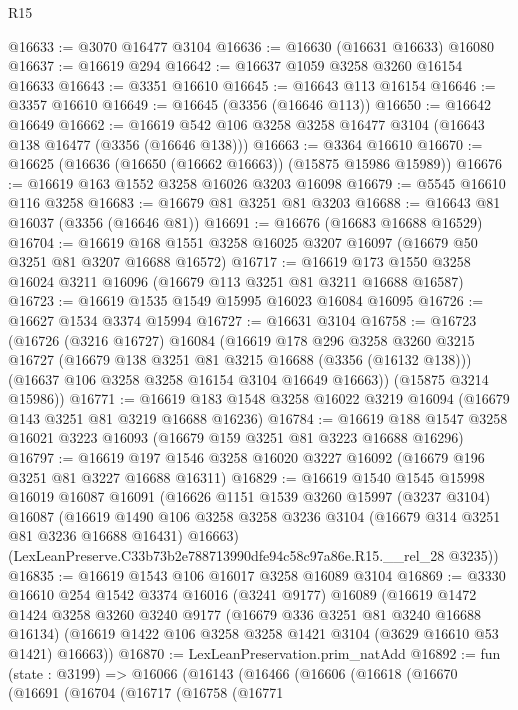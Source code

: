 \begin{lexlean}{R15}
\begin{coremodule}
@16633 := @3070 @16477 @3104
@16636 := @16630 (@16631 @16633) @16080
@16637 := @16619 @294
@16642 := @16637 @1059 @3258 @3260 @16154 @16633
@16643 := @3351 @16610
@16645 := @16643 @113 @16154
@16646 := @3357 @16610
@16649 := @16645 (@3356 (@16646 @113))
@16650 := @16642 @16649
@16662 := @16619 @542 @106 @3258 @3258 @16477 @3104 (@16643 @138 @16477 (@3356 (@16646 @138)))
@16663 := @3364 @16610
@16670 := @16625 (@16636 (@16650 (@16662 @16663)) (@15875 @15986 @15989))
@16676 := @16619 @163 @1552 @3258 @16026 @3203 @16098
@16679 := @5545 @16610 @116 @3258
@16683 := @16679 @81 @3251 @81 @3203
@16688 := @16643 @81 @16037 (@3356 (@16646 @81))
@16691 := @16676 (@16683 @16688 @16529)
@16704 := @16619 @168 @1551 @3258 @16025 @3207 @16097 (@16679 @50 @3251 @81 @3207 @16688 @16572)
@16717 := @16619 @173 @1550 @3258 @16024 @3211 @16096 (@16679 @113 @3251 @81 @3211 @16688 @16587)
@16723 := @16619 @1535 @1549 @15995 @16023 @16084 @16095
@16726 := @16627 @1534 @3374 @15994
@16727 := @16631 @3104
@16758 := @16723
    (@16726
      (@3216 @16727)
      @16084
      (@16619
        @178
        @296
        @3258
        @3260
        @3215
        @16727
        (@16679 @138 @3251 @81 @3215 @16688 (@3356 (@16132 @138)))
        (@16637 @106 @3258 @3258 @16154 @3104 @16649 @16663))
      (@15875 @3214 @15986))
@16771 := @16619 @183 @1548 @3258 @16022 @3219 @16094 (@16679 @143 @3251 @81 @3219 @16688 @16236)
@16784 := @16619 @188 @1547 @3258 @16021 @3223 @16093 (@16679 @159 @3251 @81 @3223 @16688 @16296)
@16797 := @16619 @197 @1546 @3258 @16020 @3227 @16092 (@16679 @196 @3251 @81 @3227 @16688 @16311)
@16829 := @16619
    @1540
    @1545
    @15998
    @16019
    @16087
    @16091
    (@16626
      @1151
      @1539
      @3260
      @15997
      (@3237 @3104)
      @16087
      (@16619 @1490 @106 @3258 @3258 @3236 @3104 (@16679 @314 @3251 @81 @3236 @16688 @16431) @16663)
      (LexLeanPreserve.C33b73b2e788713990dfe94c58c97a86e.R15.__rel_28 @3235))
@16835 := @16619 @1543 @106 @16017 @3258 @16089 @3104
@16869 := @3330
    @16610
    @254
    @1542
    @3374
    @16016
    (@3241 @9177)
    @16089
    (@16619
      @1472
      @1424
      @3258
      @3260
      @3240
      @9177
      (@16679 @336 @3251 @81 @3240 @16688 @16134)
      (@16619 @1422 @106 @3258 @3258 @1421 @3104 (@3629 @16610 @53 @1421) @16663))
@16870 := LexLeanPreservation.prim_natAdd
@16892 := fun (state : @3199) =>
  @16066
    (@16143
      (@16466
        (@16606
          (@16618
            (@16670
              (@16691
                (@16704
                  (@16717
                    (@16758
                      (@16771

\end{coremodule}
\end{lexlean}
